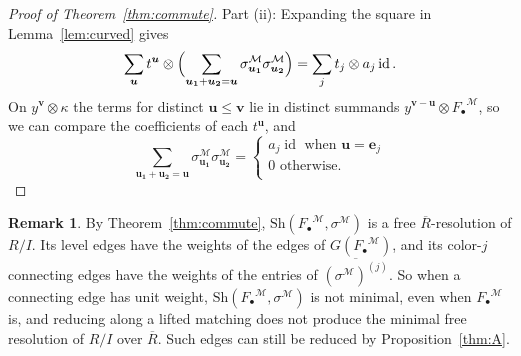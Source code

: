 \documentclass[12pt]{amsart}
\theoremstyle{plain}
\theoremstyle{definition}
\newtheorem{remark}[theorem]{Remark}
\newcommand{\F}{ {F_\bullet} }
\newcommand{\Rbar}{\overline{R}}
\newcommand{\M}{\mathcal{M}}
\newcommand{\id}{\operatorname{id}}
\newcommand{\Sh}{\mathrm{Sh}}
\begin{document}
\begin{proof}[Proof of Theorem~\ref{thm:commute}]
    Part (ii): Expanding the square in Lemma~\ref{lem:curved} gives
    \[
        \sum_{\boldsymbol{u}} t^{\boldsymbol{u}} \otimes \Bigl( \sum_{\boldsymbol{u_1} + \boldsymbol{u_2} = \boldsymbol{u}} \sigma^{\M}_{\boldsymbol{u_1}} \sigma^{\M}_{\boldsymbol{u_2}} \Bigr) = \sum_{j} t_j \otimes a_j \id .
    \]
    On $y^{\boldsymbol{v}} \otimes \kappa$ the terms for distinct $\boldsymbol{u} \le \boldsymbol{v}$ lie in distinct summands $y^{\boldsymbol{v}-\boldsymbol{u}} \otimes \F^{\M}$, so we can compare the coefficients of each $t^{\boldsymbol{u}}$, and $$\sum\limits_{\boldsymbol{u_1} + \boldsymbol{u_2} = \boldsymbol{u}} \sigma^{\M}_{\boldsymbol{u_1}} \sigma^{\M}_{\boldsymbol{u_2}}=\begin{cases} a_j \id \text{ when } \boldsymbol{u} = \boldsymbol{e}_j\\ 0 \text{ otherwise.} \\
    \end{cases}$$
\end{proof}

\begin{remark}\label{rem:unitconnecting}
    By Theorem~\ref{thm:commute}, $\Sh(\F^{\M}, \sigma^{\M})$ is a free $\Rbar$-resolution of $R/I$. Its level edges have the weights of the edges of $G(\F^{\M})$, and its color-$j$ connecting edges have the weights of the entries of $\overline{(\sigma^{\M})^{(j)}}$. So when a connecting edge has unit weight, $\Sh(\F^{\M}, \sigma^{\M})$ is not minimal, even when $\F^{\M}$ is, and reducing along a lifted matching does not produce the minimal free resolution of $R/I$ over $\Rbar$. Such edges can still be reduced by Proposition~\ref{thm:A}.
\end{remark}
\end{document}
